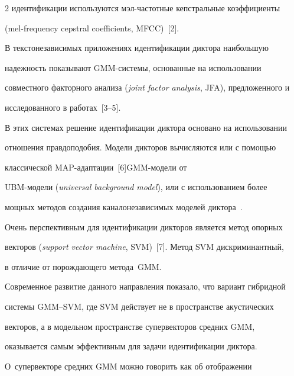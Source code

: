 \begin{multicols}{2}
идентификации используются мэл-час\-тот\-ные кепстральные коэффициенты 


(mel-frequency cepstral coefficients, MFCC)~[2]. 


  


  В текстонезависимых приложениях идентификации диктора наибольшую 


надежность показывают GMM-сис\-те\-мы, основанные на использовании 


совместного факторного анализа (\textit{joint factor analysis}, JFA), предложенного и 


исследованного в работах~[3--5].


  


  В этих системах решение идентификации диктора основано на использовании 


отношения правдоподобия. Модели дикторов вычисляются или с по\-мощью 


классической MAP-адап\-та\-ции~[6]\linebreak GMM-мо\-де\-ли от 


UBM-мо\-де\-ли (\textit{universal background model}), или с использованием более 


мощных методов создания каналонезависимых моделей дик\-то\-ра~\cite{3b, 4b}.


{ %





}


  


  Очень перспективным для идентификации дикторов является метод опорных 


векторов (\textit{support vector machine}, SVM)~[7]. Метод SVM дискриминантный, 


в отличие от порождающего метода~GMM. 


  


  Современное развитие данного направления показало, что вариант гибридной 


системы GMM--SVM, где SVM действует не в пространстве акус\-ти\-че\-ских 


векторов, а в модельном пространстве супервекторов средних GMM, 


оказывается самым эффективным для задачи идентификации диктора. 


О~супервекторе средних GMM можно говорить как об отображении 



\end{multicols}
